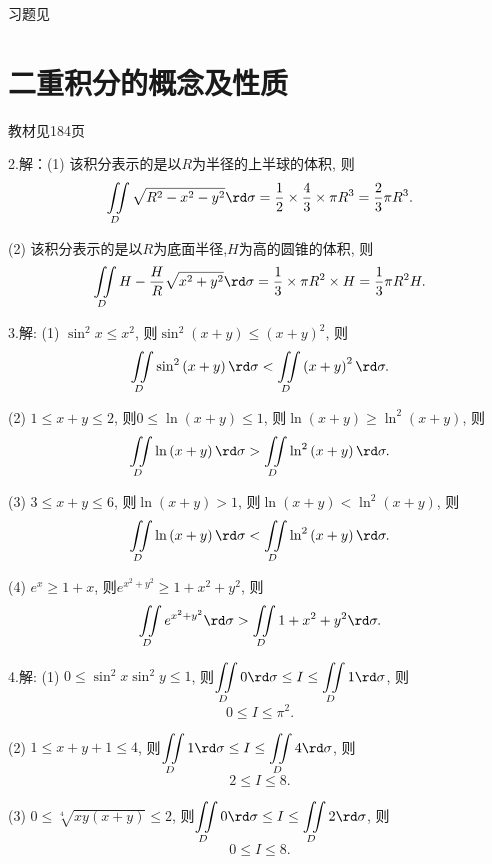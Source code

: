 \begin{flushright}
  \color{zhanqing!80}
   习题见
\end{flushright}
\section{二重积分的概念及性质}
\begin{flushright}
  \color{zhanqing!80}
   教材见184页
\end{flushright}

  2.解：(1) 该积分表示的是以$R$为半径的上半球的体积, 则$$\displaystyle\iint \limits_D \sqrt{R^2-x^2-y^2} \rd \sigma =  \dfrac{1}{2} \times  \dfrac{4}{3} \times \pi R^3 =  \dfrac{2}{3}\pi R^3.$$

  (2) 该积分表示的是以$R$为底面半径,$H$为高的圆锥的体积, 则$$\displaystyle\iint \limits_D H- \dfrac{H}{R}\sqrt{x^2+y^2} \rd \sigma =  \dfrac{1}{3} \times \pi R^2 \times H =  \dfrac{1}{3}\pi R^2 H.$$

  3.解: (1) $\sin^2 x \le x^2$,  则$\sin^2\left( x+y \right) \le \left( x+y \right)^2$, 则$$\displaystyle\iint \limits_D \sin^2\left( x+y \right) \rd \sigma < \displaystyle\iint \limits_D \left( x+y \right)^2 \rd \sigma.$$

  (2) $1 \le x+y \le 2$,  则$0 \le \ln\left( x+y \right) \le 1$, 则$\ln \left( x+y \right) \ge \ln^2 \left( x+y \right)$, 则$$\displaystyle\iint \limits_D \ln \left( x+y \right) \rd \sigma > \displaystyle\iint \limits_D \ln^2 \left( x+y \right) \rd \sigma.$$

  (3) $3 \le x+y \le 6$,  则$\ln\left( x+y \right) > 1$, 则$\ln \left( x+y \right) < \ln^2 \left( x+y \right)$, 则$$\displaystyle\iint \limits_D \ln \left( x+y \right) \rd \sigma < \displaystyle\iint \limits_D \ln^2 \left( x+y \right) \rd \sigma.$$

  (4) $e^x \ge 1+x$,  则$e^{x^2+y^2} \ge 1+{x^2+y^2}$, 则$$\displaystyle\iint \limits_D e^{x^2+y^2} \rd \sigma > \displaystyle\iint \limits_D 1+{x^2+y^2} \rd \sigma.$$

  4.解: (1) $0 \le \sin^2 x \sin^2 y \le 1$, 则$\displaystyle\displaystyle\iint \limits_D 0 \rd \sigma \le I \le \displaystyle\displaystyle\iint \limits_D 1 \rd \sigma$, 则$$0 \le I \le \pi^2.$$

  (2) $1 \le x+y+1 \le 4$, 则$\displaystyle\displaystyle\iint \limits_D 1 \rd \sigma \le I \le \displaystyle\displaystyle\iint \limits_D 4 \rd \sigma$, 则$$2 \le I \le 8.$$

  (3) $0 \le \sqrt[4]{xy(x+y)} \le 2$, 则$\displaystyle\displaystyle\iint \limits_D 0 \rd \sigma \le I \le \displaystyle\displaystyle\iint \limits_D 2 \rd \sigma$, 则$$0 \le I \le 8.$$

